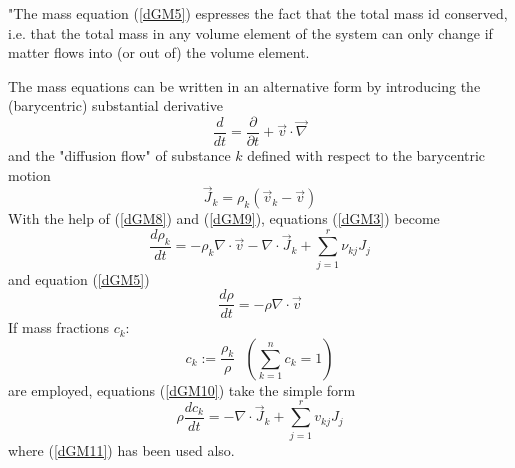 "The mass equation (\ref{dGM5}) espresses the fact that the total mass id conserved, i.e. that the total mass in any volume element of the system can only change if matter flows into (or out of) the volume element.

The mass equations can be written in an alternative form by introducing the (barycentric) substantial derivative
\begin{equation}
\frac{d}{dt} = \frac{\partial}{\partial t} + \vec{v} \cdot \vec{\nabla}
\label{dGM8}
\end{equation}
and the "diffusion flow" of substance $k$ defined with respect to the barycentric motion
\begin{equation}
\vec{J}_k = \rho_k (\vec{v}_k - \vec{v})
\label{dGM9}
\end{equation}
With the help of (\ref{dGM8}) and (\ref{dGM9}), equations (\ref{dGM3}) become
\begin{equation}
\frac{d \rho_k}{dt} = - \rho_k \nabla \cdot \vec{v} - \nabla \cdot \vec{J}_k + \sum_{j=1}^r \nu_{kj} J_j
\label{dGM10}
\end{equation}
and equation (\ref{dGM5})
\begin{equation}
\frac{d \rho}{dt} = - \rho \nabla \cdot \vec{v}
\label{dGM11}
\end{equation}
If mass fractions $c_k$:
\begin{equation}
c_k := \frac{\rho_k}{\rho} \ \ \ \left( \sum_{k=1}^n c_k =1 \right)
\label{dGM12}
\end{equation}
are employed, equations (\ref{dGM10}) take the simple form
\begin{equation}
\rho \frac{dc_k}{dt} = - \nabla \cdot \vec{J}_k + \sum_{j=1}^r v_{kj} J_j
\label{dGM13}
\end{equation}
where (\ref{dGM11}) has been used also.